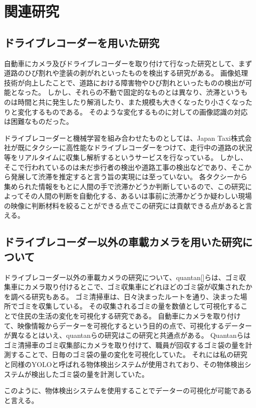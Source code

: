 \chapter{関連研究}
\section{ドライブレコーダーを用いた研究}
自動車にカメラ及びドライブレコーダーを取り付けて行なった研究として、まず道路のひび割れや塗装の剥がれといったものを検出する研究がある。
画像処理技術が向上したことで、道路における障害物やひび割れといったものの検出が可能となった。
しかし、それらの不動で固定的なものとは異なり、渋滞というものは時間と共に発生したり解消したり、また規模も大きくなったり小さくなったりと変化するものである。
そのような変化するものに対しての画像認識の対応は困難なものだった。

ドライブレコーダーと機械学習を組み合わせたものとしては、Japan Taxi株式会社が既にタクシーに高性能なドライブレコーダーをつけて、走行中の道路の状況等をリアルタイムに収集し解析するというサービスを行なっている。
しかし、そこで行われているのは未だ歩行者の検出や道路工事の検出などであり、そこから発展して渋滞を推定すると言う旨の実現には至っていない。
各タクシーから集められた情報をもとに人間の手で渋滞かどうか判断しているので、この研究によってその人間の判断を自動化する、あるいは事前に渋滞かどうか疑わしい現場の映像に判断材料を絞ることができる点でこの研究には貢献できる点があると言える。

\section{ドライブレコーダー以外の車載カメラを用いた研究について}
ドライブレコーダー以外の車載カメラの研究について、quantan[]らは、ゴミ収集車にカメラ取り付けるとこで、ゴミ収集車にどれほどのゴミ袋が収集されたかを調べる研究もある。
ゴミ清掃車は、日々決まったルートを通り、決まった場所でゴミを収集している。
その収集されるゴミの量を数値として可視化することで住民の生活の変化を可視化する研究である。
自動車にカメラを取り付けて、映像情報からデーターを可視化するという目的の点で、可視化するデーターが異なるとはいえ、quantanらの研究はこの研究と共通点がある。
Quantanらはゴミ清掃車のゴミ収集部にカメラを取り付けて、職員が回収するゴミ袋の量を計測することで、日毎のゴミ袋の量の変化を可視化していた。
それには私の研究と同様のYOLOと呼ばれる物体検出システムが使用されており、その物体検出システムが検出したゴミ袋の量を計測していた。

このように、物体検出システムを使用することでデーターの可視化が可能であると言える。



